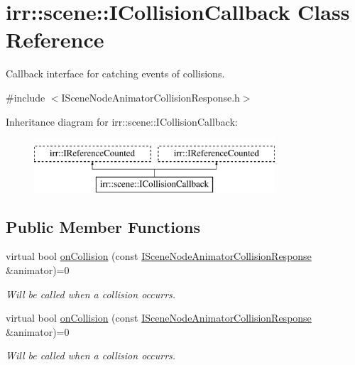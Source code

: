 \hypertarget{classirr_1_1scene_1_1ICollisionCallback}{}\section{irr\+:\+:scene\+:\+:I\+Collision\+Callback Class Reference}
\label{classirr_1_1scene_1_1ICollisionCallback}


Callback interface for catching events of collisions.  




{\ttfamily \#include $<$I\+Scene\+Node\+Animator\+Collision\+Response.\+h$>$}

Inheritance diagram for irr\+:\+:scene\+:\+:I\+Collision\+Callback\+:\begin{figure}[H]
\begin{center}
\leavevmode
\includegraphics[height=2.000000cm]{classirr_1_1scene_1_1ICollisionCallback}
\end{center}
\end{figure}
\subsection*{Public Member Functions}
\begin{DoxyCompactItemize}
\item 
virtual bool \hyperlink{classirr_1_1scene_1_1ICollisionCallback_a35791df17defc6fd301dccef1cae596a}{on\+Collision} (const \hyperlink{classirr_1_1scene_1_1ISceneNodeAnimatorCollisionResponse}{I\+Scene\+Node\+Animator\+Collision\+Response} \&animator)=0
\begin{DoxyCompactList}\small\item\em Will be called when a collision occurrs. \end{DoxyCompactList}\item 
virtual bool \hyperlink{classirr_1_1scene_1_1ICollisionCallback_a35791df17defc6fd301dccef1cae596a}{on\+Collision} (const \hyperlink{classirr_1_1scene_1_1ISceneNodeAnimatorCollisionResponse}{I\+Scene\+Node\+Animator\+Collision\+Response} \&animator)=0
\begin{DoxyCompactList}\small\item\em Will be called when a collision occurrs. \end{DoxyCompactList}\end{DoxyCompactItemize}
